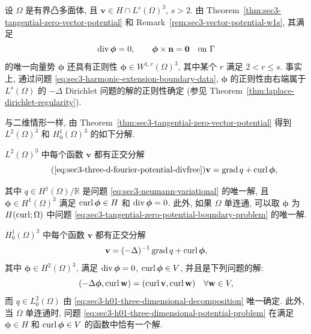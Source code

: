 \setcounter{statement}{13}
\begin{Remark}\label{rem:sec3-convex-polyhedron-potential-w1p}
设 $\Omega$ 是有界凸多面体, 且 $\mathbf v\in H\cap L^s(\Omega)^3$,
$s>2$. 由 Theorem~\ref{thm:sec3-tangential-zero-vector-potential} 和
Remark~\ref{rem:sec3-vector-potential-w1s}, 其满足
\[
\operatorname{div}\boldsymbol\phi=0,
\qquad
\boldsymbol\phi\times\mathbf n=\mathbf0\quad\text{on }\Gamma
\]
的唯一向量势 $\boldsymbol\phi$ 还具有正则性
$\boldsymbol\phi\in W^{1,r}(\Omega)^3$, 其中某个 $r$ 满足 $2<r\le s$.
事实上, 通过问题 \eqref{eq:sec3-harmonic-extension-boundary-data},
$\boldsymbol\phi$ 的正则性由右端属于 $L^s(\Omega)$ 的 $-\Delta$ Dirichlet 问题的解的正则性确定
(参见 Theorem~\ref{thm:laplace-dirichlet-regularity}).
\end{Remark}

与二维情形一样, 由 Theorem~\ref{thm:sec3-tangential-zero-vector-potential}
得到 $L^2(\Omega)^3$ 和 $H_0^1(\Omega)^3$ 的如下分解.

\setcounter{statement}{3}
\begin{Corollary}\label{cor:sec3-l2-three-dimensional-decomposition}
$L^2(\Omega)^3$ 中每个函数 $\mathbf v$ 都有正交分解
\begin{equation}
\tag{\ref*{eq:sec3-three-d-fourier-potential-divfree}}
\label{eq:sec3-l2-three-dimensional-decomposition}
\mathbf v=\Grad q+\Curl\boldsymbol\phi,
\end{equation}

其中 $q\in H^1(\Omega)/\mathbb R$ 是问题
\eqref{eq:sec3-neumann-variational} 的唯一解, 且
$\boldsymbol\phi\in H^1(\Omega)^3$ 满足
$\operatorname{curl}\boldsymbol\phi\in H$ 和 $\operatorname{div}\boldsymbol\phi=0$.
此外, 如果 $\Omega$ 单连通, 可以取 $\boldsymbol\phi$ 为
$H(\operatorname{curl};\Omega)$ 中问题
\eqref{eq:sec3-tangential-zero-potential-boundary-problem} 的唯一解.
\end{Corollary}

\setcounter{statement}{4}
\begin{Corollary}\label{cor:sec3-h01-three-dimensional-decomposition}
$H_0^1(\Omega)^3$ 中每个函数 $\mathbf v$ 都有正交分解
\begin{equation}\label{eq:sec3-h01-three-dimensional-decomposition}
\mathbf v=(-\Delta)^{-1}\operatorname{grad} q+\operatorname{curl}\boldsymbol\phi,
\end{equation}
其中 $\boldsymbol\phi\in H^2(\Omega)^3$, 满足
$\operatorname{div}\boldsymbol\phi=0$, $\operatorname{curl}\boldsymbol\phi\in V$, 并且是下列问题的解:
\begin{equation}\label{eq:sec3-h01-three-dimensional-potential-problem}
(-\Delta\boldsymbol\phi,\operatorname{curl}\mathbf w)
=(\operatorname{curl}\mathbf v,\operatorname{curl}\mathbf w)
\quad\forall\mathbf w\in V,
\end{equation}
而 $q\in L_0^2(\Omega)$ 由
\eqref{eq:sec3-h01-three-dimensional-decomposition} 唯一确定.
此外, 当 $\Omega$ 单连通时, 问题
\eqref{eq:sec3-h01-three-dimensional-potential-problem} 在满足
$\boldsymbol\phi\in H$ 和 $\operatorname{curl}\boldsymbol\phi\in V$ 的函数中恰有一个解.
\end{Corollary}

